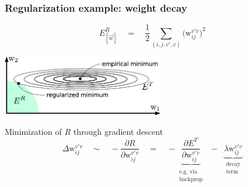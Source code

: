 \begin{frame}\frametitle{Regularization example: weight decay}
	\begin{equation*}
		E_{[\vec{w}]}^R \quad=\quad \frac{1}{2} \sum_{(i, j, v', v)} 
			\big( \mathrm{w}_{ij}^{v'v} \big)^2
	\end{equation*}
	
	\begin{center}
		\includegraphics[width=7cm]{img/empirical_vs_regularized}
	\end{center}

	\begin{block}{Minimization of $R$ through gradient descent}
		\begin{equation*}
			\Delta \mathrm{w}_{ij}^{v'v} \quad\sim\quad 
				-\frac{\partial R}{\partial \mathrm{w}_{ij}^{v'v}}
			\quad=\quad - \underbrace{\frac{\partial E^T}%
				{\partial \mathrm{w}_{ij}^{v'v}}}_{
				\substack{\text{e.g. via} \\ \text{backprop}}}
			\;\;-\;\; \underbrace{\lambda \mathrm{w}_{ij}^{v'v}}_{
				\substack{\text{decay} \\ \text{term}}}
		\end{equation*}
	\end{block}
\end{frame}


